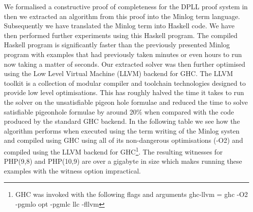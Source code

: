 \documentclass{article}
\begin{document}
We formalised a constructive proof of completeness for the DPLL proof system in \cite{AL12} then we extracted an algorithm from this proof into the Minlog term language. Subsequently we have translated the Minlog term into Haskell code. We have then performed further experiments using this Haskell program.  The compiled Haskell program is significantly faster than the previously presented Minlog program with examples that had previously taken minutes or even hours to run now taking a matter of seconds. Our extracted solver was then further optimised using the Low Level Virtual Machine (LLVM) backend for GHC. The LLVM toolkit \cite{CL04} is a collection of modular compiler and toolchain technologies designed to provide low level optimisations. This has roughly halved the time it takes to run the solver on the unsatisfiable pigeon hole formulae and reduced the time to solve satisfiable pigeonhole formulae by around 20\%  when compared with the code produced by the standard GHC backend. In the following table we see how the algorithm performs when executed using the term writing of the Minlog systen and compiled using GHC using all of its non-dangerous optimisations (-O2) and compiled using the LLVM backend for GHC\footnote{GHC was invoked with the following flags and arguments ghc-llvm = ghc -O2 -pgmlo opt -pgmlc llc -fllvm}. The resulting witnesses for PHP(9,8) and PHP(10,9) are over a gigabyte in size which makes running these examples with the witness option impractical.
\end{document}
